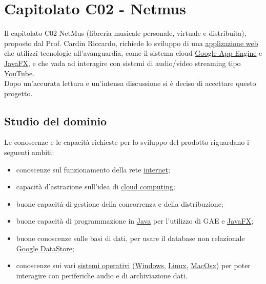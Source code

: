 \chapter{Capitolato C02 - Netmus}
\thispagestyle{fancy}
Il capitolato C02 NetMus (libreria musicale personale, virtuale e distribuita),
proposto dal Prof. Cardin Riccardo, richiede lo sviluppo di una
\underline{applizazione web} che utilizzi tecnologie all'avanguardia, come il
sistema cloud \underline{Google App Engine} e \underline{JavaFX}, e che vada ad
interagire con sistemi di audio/video streaming tipo \underline{YouTube}.\\

Dopo un'accurata lettura e un'intensa discussione si \`e deciso di accettare
questo progetto.

\section{Studio del dominio} 
Le conoscenze e le capacit\`a richieste per lo sviluppo del prodotto
riguardano i seguenti ambiti:
\begin{itemize}
  \item conoscenze sul funzionamento della rete \underline{internet};
  \item capacit\`a d'astrazione sull'idea di \underline{cloud computing};
  \item buone capacit\`a di gestione della concorrenza e della distribuzione;
  \item buone capacit\`a di programmazione in \underline{Java} per l'utilizzo di
  GAE e \underline{JavaFX};
  \item buone conoscenze sulle basi di dati, per usare il database
  non relazionale \underline{Google DataStore};
  \item conoscenze sui vari \underline{sistemi operativi} (\underline{Windows},
  \underline{Linux}, \underline{MacOsx}) per poter interagire con periferiche
  audio e di archiviazione dati.
\end{itemize}

